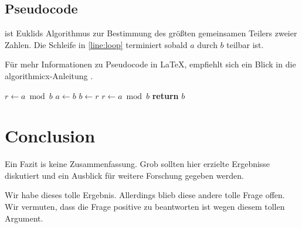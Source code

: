 \documentclass[a4paper,titlepage,twocolumn,oneside,12pt,ngerman,titlepage=firstiscover]{scrbook}
\theoremstyle{plain} %
\theoremstyle{definition} %
\theoremstyle{remark} %
\theoremstyle{plain}
\newcommand{\NN}{\mathbb{N}} %
\begin{document}
\section{Pseudocode}

 ist Euklids Algorithmus zur Bestimmung des größten gemeinsamen Teilers zweier Zahlen.
Die Schleife in \cref{line:loop} terminiert sobald $a$ durch $b$ teilbar ist.

Für mehr Informationen zu Pseudocode in \LaTeX, empfiehlt sich ein Blick in die algorithmicx-Anleitung \cite{algorithmicx}.



\begin{algorithm}
\caption{Euklids Algorithmus}\label{alg:euclid}
\begin{algorithmic}[1]
\Input{$a, b \in \NN$}
	\State $r\gets a\bmod b$ 
	 \label{line:loop}
		\State $a\gets b$
		\State $b\gets r$
		\State $r\gets a\bmod b$
	\EndWhile
	\State \textbf{return} $b$
\EndFunction
\end{algorithmic}
\end{algorithm}


\chapter{Conclusion}

Ein Fazit is keine Zusammenfassung.
Grob sollten hier erzielte Ergebnisse diskutiert und ein Ausblick für weitere Forschung gegeben werden.

Wir habe dieses tolle Ergebnis.
Allerdings blieb diese andere tolle Frage offen.
Wir vermuten, dass die Frage positive zu beantworten ist wegen diesem tollen Argument.

\printbibliography[heading=bibintoc,title={Literatur}]
\end{document}

